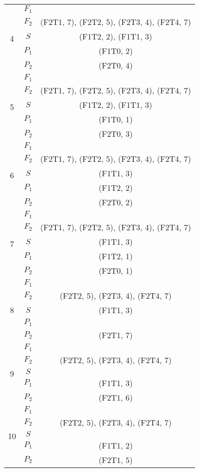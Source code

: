 \documentclass[a4paper,14pt]{extarticle}
\begin{document}
\begin{enumerate}
\begin{longtable}{|c|c|c|}
\multirow{5}{*}{4}&$F_1$&\\
\cline{2-3}
&$F_2$&(F2T1, 7), (F2T2, 5), (F2T3, 4), (F2T4, 7)\\
\cline{2-3}
& $S$ &(F1T2, 2), (F1T1, 3)\\
\cline{2-3}
&$P_1$&(F1T0, 2)\\
\cline{2-3}
&$P_2$&(F2T0, 4)\\
\hline


\multirow{5}{*}{5}&$F_1$&\\
\cline{2-3}
&$F_2$&(F2T1, 7), (F2T2, 5), (F2T3, 4), (F2T4, 7)\\
\cline{2-3}
& $S$ &(F1T2, 2), (F1T1, 3)\\
\cline{2-3}
&$P_1$&(F1T0, 1)\\
\cline{2-3}
&$P_2$&(F2T0, 3)\\
\hline


\multirow{5}{*}{6}&$F_1$&\\
\cline{2-3}
&$F_2$&(F2T1, 7), (F2T2, 5), (F2T3, 4), (F2T4, 7)\\
\cline{2-3}
& $S$ &(F1T1, 3)\\
\cline{2-3}
&$P_1$&(F1T2, 2)\\
\cline{2-3}
&$P_2$&(F2T0, 2)\\
\hline


\multirow{5}{*}{7}&$F_1$&\\
\cline{2-3}
&$F_2$&(F2T1, 7), (F2T2, 5), (F2T3, 4), (F2T4, 7)\\
\cline{2-3}
& $S$ &(F1T1, 3)\\
\cline{2-3}
&$P_1$&(F1T2, 1)\\
\cline{2-3}
&$P_2$&(F2T0, 1)\\
\hline


\multirow{5}{*}{8}&$F_1$&\\
\cline{2-3}
&$F_2$&(F2T2, 5), (F2T3, 4), (F2T4, 7)\\
\cline{2-3}
& $S$ &(F1T1, 3)\\
\cline{2-3}
&$P_1$&\\
\cline{2-3}
&$P_2$&(F2T1, 7)\\
\hline


\multirow{5}{*}{9}&$F_1$&\\
\cline{2-3}
&$F_2$&(F2T2, 5), (F2T3, 4), (F2T4, 7)\\
\cline{2-3}
& $S$ &\\
\cline{2-3}
&$P_1$&(F1T1, 3)\\
\cline{2-3}
&$P_2$&(F2T1, 6)\\
\hline


\multirow{5}{*}{10}&$F_1$&\\
\cline{2-3}
&$F_2$&(F2T2, 5), (F2T3, 4), (F2T4, 7)\\
\cline{2-3}
& $S$ &\\
\cline{2-3}
&$P_1$&(F1T1, 2)\\
\cline{2-3}
&$P_2$&(F2T1, 5)\\
\hline



\end{longtable}
\end{enumerate}
\end{document}
